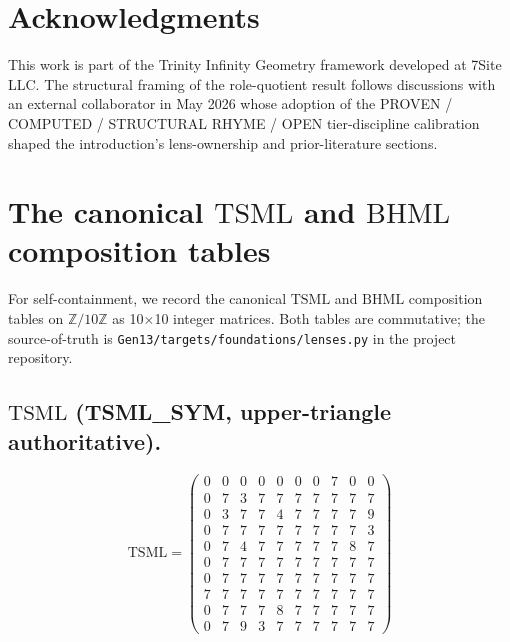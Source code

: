\documentclass[11pt,reqno]{amsart}
\theoremstyle{plain}
\theoremstyle{definition}
\theoremstyle{remark}
\newcommand{\Z}{\mathbb{Z}}
\newcommand{\TS}{\mathrm{TSML}}
\newcommand{\BH}{\mathrm{BHML}}
\begin{document}
\section*{Acknowledgments}

This work is part of the Trinity Infinity Geometry framework
developed at 7Site LLC. The structural framing of the role-quotient
result follows discussions with an external collaborator in May
2026 whose adoption of the
PROVEN / COMPUTED / STRUCTURAL RHYME / OPEN tier-discipline
calibration shaped the introduction's lens-ownership and prior-literature
sections.

\appendix
\section{The canonical $\TS$ and $\BH$ composition tables} \label{app:tables}

For self-containment, we record the canonical $\TS$ and $\BH$
composition tables on $\Z/10\Z$ as 10$\times$10 integer matrices.
Both tables are commutative; the source-of-truth is
\texttt{Gen13/targets/foundations/lenses.py} in the project repository.

\subsection*{$\TS$ (TSML\_SYM, upper-triangle authoritative).}

\[
\TS =
\begin{pmatrix}
0 & 0 & 0 & 0 & 0 & 0 & 0 & 7 & 0 & 0 \\
0 & 7 & 3 & 7 & 7 & 7 & 7 & 7 & 7 & 7 \\
0 & 3 & 7 & 7 & 4 & 7 & 7 & 7 & 7 & 9 \\
0 & 7 & 7 & 7 & 7 & 7 & 7 & 7 & 7 & 3 \\
0 & 7 & 4 & 7 & 7 & 7 & 7 & 7 & 8 & 7 \\
0 & 7 & 7 & 7 & 7 & 7 & 7 & 7 & 7 & 7 \\
0 & 7 & 7 & 7 & 7 & 7 & 7 & 7 & 7 & 7 \\
7 & 7 & 7 & 7 & 7 & 7 & 7 & 7 & 7 & 7 \\
0 & 7 & 7 & 7 & 8 & 7 & 7 & 7 & 7 & 7 \\
0 & 7 & 9 & 3 & 7 & 7 & 7 & 7 & 7 & 7
\end{pmatrix}
\]
\end{document}
